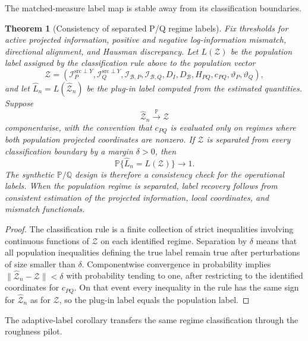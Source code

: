 \documentclass[11pt,a4paper]{amsart}
\theoremstyle{plain}
\newtheorem{theorem}{Theorem}[section]
\theoremstyle{definition}
\theoremstyle{remark}
\newcommand{\PP}{\mathbb{P}}
\newcommand{\QQ}{\mathbb{Q}}
\newcommand{\toP}{\xrightarrow{\PP}}
\newcommand{\scrB}{\mathcal{B}}
\newcommand{\scrI}{\mathcal{I}}
\begin{document}
The matched-measure label map is stable away from its classification boundaries.

\begin{theorem}[Consistency of separated P/Q regime labels]\label{thm:pq-label-consistency}
Fix thresholds for active projected information, positive and negative log-information mismatch,
directional alignment, and Hausman discrepancy.  Let \(L(\mathcal Z)\) be the population label
assigned by the classification rule above to the population vector
\[
        \mathcal Z
        =
        \left(
        \scrI_P^{\mathrm{src}\perp Y},
        \scrI_Q^{\mathrm{src}\perp Y},
        \scrI_{\scrB,P},
        \scrI_{\scrB,Q},
        D_I,
        D_{\scrB},
        H_{PQ},
        c_{PQ},
        \vartheta_P,
        \vartheta_Q
        \right),
\]
and let \(\widehat L_n=L(\widehat{\mathcal Z}_n)\) be the plug-in label computed from the estimated
quantities.  Suppose
\[
        \widehat{\mathcal Z}_n\toP\mathcal Z
\]
componentwise, with the convention that \(c_{PQ}\) is evaluated only on regimes where both
population projected coordinates are nonzero.  If \(\mathcal Z\) is separated from every
classification boundary by a margin \(\delta>0\), then
\[
        \PP\{\widehat L_n=L(\mathcal Z)\}\to1.
\]
The synthetic \(\PP/\QQ\) design is therefore a consistency check for the operational labels.  When
the population regime is separated, label recovery follows from consistent estimation of the
projected information, local coordinates, and mismatch functionals.
\end{theorem}

\begin{proof}
The classification rule is a finite collection of strict inequalities involving continuous
functions of \(\mathcal Z\) on each identified regime.  Separation by \(\delta\) means that all
population inequalities defining the true label remain true after perturbations of size smaller
than \(\delta\).  Componentwise convergence in probability implies
\(\|\widehat{\mathcal Z}_n-\mathcal Z\|<\delta\) with probability tending to one, after restricting
to the identified coordinates for \(c_{PQ}\).  On that event every inequality in the rule has the
same sign for \(\widehat{\mathcal Z}_n\) as for \(\mathcal Z\), so the plug-in label equals the
population label.
\end{proof}

The adaptive-label corollary transfers the same regime classification through the roughness pilot.
\end{document}
